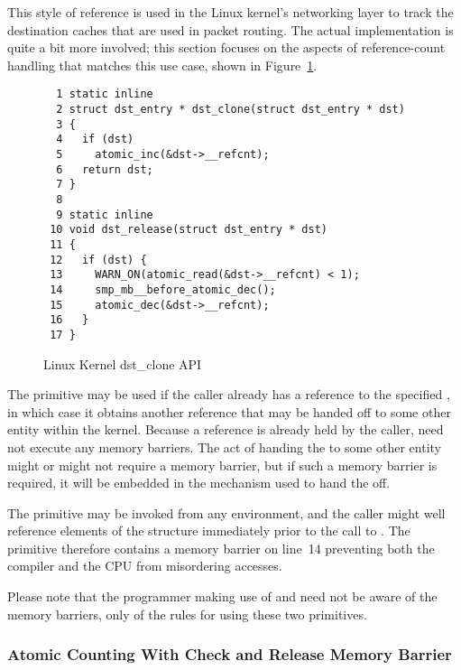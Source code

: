 This style of reference is used in the Linux kernel's networking
layer to track the destination caches that are used in packet routing.
The actual implementation is quite a bit more involved; this section
focuses on the aspects of   reference-count
handling that matches this use case,
shown in Figure~\ref{fig:defer:Linux Kernel dst-clone API}.

\begin{figure}[htbp]
{ \scriptsize
\begin{verbatim}
  1 static inline
  2 struct dst_entry * dst_clone(struct dst_entry * dst)
  3 {
  4   if (dst)
  5     atomic_inc(&dst->__refcnt);
  6   return dst;
  7 }
  8
  9 static inline
 10 void dst_release(struct dst_entry * dst)
 11 {
 12   if (dst) {
 13     WARN_ON(atomic_read(&dst->__refcnt) < 1);
 14     smp_mb__before_atomic_dec();
 15     atomic_dec(&dst->__refcnt);
 16   }
 17 }
\end{verbatim}
}
\caption{Linux Kernel dst\_clone API}
\label{fig:defer:Linux Kernel dst-clone API}
\end{figure}

The  primitive may be used if the caller
already has a reference to the specified ,
in which case it obtains another reference that may be handed off
to some other entity within the kernel.
Because a reference is already held by the caller, 
need not execute any memory barriers.
The act of handing the  to some other entity might
or might not require a memory barrier, but if such a memory barrier
is required, it will be embedded in the mechanism used to hand the
 off.

The  primitive may be invoked from any environment,
and the caller might well reference elements of the 
structure immediately prior to the call to .
The  primitive therefore contains a memory
barrier on line~14 preventing both the compiler and the CPU
from misordering accesses.

Please note that the programmer making use of  and
 need not be aware of the memory barriers, only
of the rules for using these two primitives.

\subsubsection{Atomic Counting With Check and Release Memory Barrier}
\label{sec:defer:Atomic Counting With Check and Release Memory Barrier}

